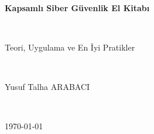 \documentclass[11pt,a4paper,twoside]{book}
\newcommand{\KitapBaslik}{Kapsamlı Siber Güvenlik El Kitabı}
\newcommand{\KitapAltBaslik}{Teori, Uygulama ve En İyi Pratikler}
\newcommand{\YazarAdi}{Yusuf Talha ARABACI}
\begin{document}
\begin{titlepage}
  \centering
  \vspace*{3cm}
  {\Huge\bfseries \KitapBaslik \par}
  \vspace{0.5cm}
  {\Large \KitapAltBaslik \par}
  \vfill
  {\Large \YazarAdi \par}
  \vspace{1cm}
  {\large \today \par}
\end{titlepage}

\frontmatter
\tableofcontents

\mainmatter
















\backmatter
\end{document}
